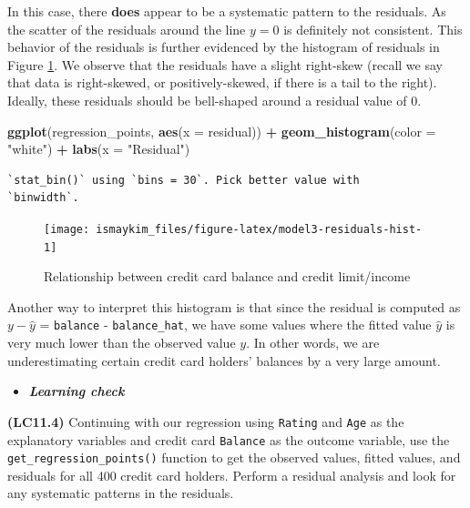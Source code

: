 \documentclass[12pt, krantz2,]{krantz}
\makeatletter
\newenvironment{Shaded}{\begin{snugshade}}{\end{snugshade}}
\newcommand{\DataTypeTok}[1]{\textcolor[rgb]{0.27,0.27,0.27}{#1}}
\newcommand{\KeywordTok}[1]{\textcolor[rgb]{0.27,0.27,0.27}{\textbf{#1}}}
\newcommand{\NormalTok}[1]{#1}
\newcommand{\OperatorTok}[1]{\textcolor[rgb]{0.43,0.43,0.43}{\textbf{#1}}}
\newcommand{\StringTok}[1]{\textcolor[rgb]{0.5,0.5,0.5}{#1}}
\newenvironment{kframe}{%
\medskip{}
\setlength{\fboxsep}{.8em}
 \def\at@end@of@kframe{}%
 \ifinner\ifhmode%
  \def\at@end@of@kframe{\end{minipage}}%
  \begin{minipage}{\columnwidth}%
 \fi\fi%
 \def\FrameCommand##1{\hskip\@totalleftmargin \hskip-\fboxsep
 \colorbox{shadecolor}{##1}\hskip-\fboxsep
     \hskip-\linewidth \hskip-\@totalleftmargin \hskip\columnwidth}%
 \MakeFramed {\advance\hsize-\width
   \@totalleftmargin\z@ \linewidth\hsize
   \@setminipage}}%
 {\par\unskip\endMakeFramed%
 \at@end@of@kframe}
\renewenvironment{Shaded}{\begin{kframe}}{\end{kframe}}
\newenvironment{rmdblock}[1]
  {\begin{shaded*}
  \begin{itemize}
  \renewcommand{\labelitemi}{
    \raisebox{-.7\height}[0pt][0pt]{
    }
  }
  \item
  }
  {
  \end{itemize}
  \end{shaded*}
  }
\newenvironment{learncheck}
  {\begin{rmdblock}{warning}}
  {\end{rmdblock}}
\makeatother
\begin{document}
In this case, there \textbf{does} appear to be a systematic pattern to the residuals. As the scatter of the residuals around the line \(y=0\) is definitely not consistent. This behavior of the residuals is further evidenced by the histogram of residuals in Figure \ref{fig:model3-residuals-hist}. We observe that the residuals have a slight right-skew (recall we say that data is right-skewed, or positively-skewed, if there is a tail to the right). Ideally, these residuals should be bell-shaped around a residual value of 0.

\begin{Shaded}
\begin{Highlighting}[]
\KeywordTok{ggplot}\NormalTok{(regression_points, }\KeywordTok{aes}\NormalTok{(}\DataTypeTok{x =}\NormalTok{ residual)) }\OperatorTok{+}
\StringTok{  }\KeywordTok{geom_histogram}\NormalTok{(}\DataTypeTok{color =} \StringTok{"white"}\NormalTok{) }\OperatorTok{+}
\StringTok{  }\KeywordTok{labs}\NormalTok{(}\DataTypeTok{x =} \StringTok{"Residual"}\NormalTok{)}
\end{Highlighting}
\end{Shaded}

\begin{verbatim}
`stat_bin()` using `bins = 30`. Pick better value with
`binwidth`.
\end{verbatim}

\begin{figure}

{\centering \texttt{[image: ismaykim\_files/figure-latex/model3-residuals-hist-1]} 

}

\caption{Relationship between credit card balance and credit limit/income}\label{fig:model3-residuals-hist}
\end{figure}

Another way to interpret this histogram is that since the residual is computed as \(y - \widehat{y}\) = \texttt{balance} - \texttt{balance\_hat}, we have some values where the fitted value \(\widehat{y}\) is very much lower than the observed value \(y\). In other words, we are underestimating certain credit card holders' balances by a very large amount.

\begin{learncheck}
\textbf{\emph{Learning check}}
\end{learncheck}

\textbf{(LC11.4)} Continuing with our regression using \texttt{Rating} and \texttt{Age} as the explanatory variables and credit card \texttt{Balance} as the outcome variable, use the \texttt{get\_regression\_points()} function to get the observed values, fitted values, and residuals for all 400 credit card holders. Perform a residual analysis and look for any systematic patterns in the residuals.
\end{document}
